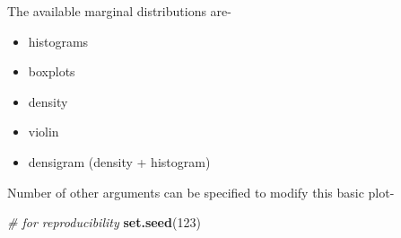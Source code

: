 \documentclass[
]{article}
\newenvironment{Shaded}{\begin{snugshade}}{\end{snugshade}}
\newcommand{\CommentTok}[1]{\textcolor[rgb]{0.56,0.35,0.01}{\textit{#1}}}
\newcommand{\DecValTok}[1]{\textcolor[rgb]{0.00,0.00,0.81}{#1}}
\newcommand{\KeywordTok}[1]{\textcolor[rgb]{0.13,0.29,0.53}{\textbf{#1}}}
\newcommand{\NormalTok}[1]{#1}
\providecommand{\tightlist}{%
  \setlength{\itemsep}{0pt}\setlength{\parskip}{0pt}}
\begin{document}
The available marginal distributions are-

\begin{itemize}
\tightlist
\item
  histograms
\item
  boxplots
\item
  density
\item
  violin
\item
  densigram (density + histogram)
\end{itemize}

Number of other arguments can be specified to modify this basic plot-

\begin{Shaded}
\begin{Highlighting}[]
\CommentTok{\# for reproducibility}
\KeywordTok{set.seed}\NormalTok{(}\DecValTok{123}\NormalTok{)}


\end{Highlighting}
\end{Shaded}
\end{document}
